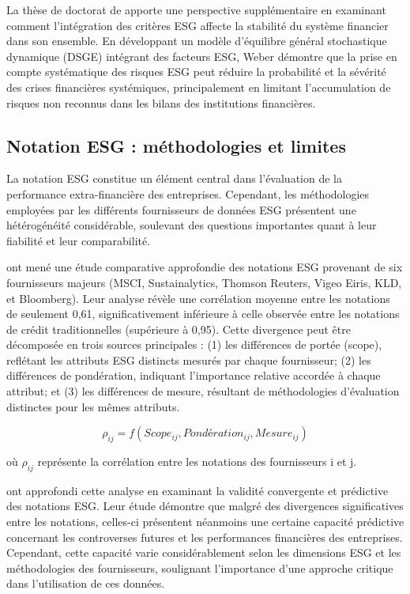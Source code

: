 La thèse de doctorat de \citet{weber2018} apporte une perspective supplémentaire en examinant comment l'intégration des critères ESG affecte la stabilité du système financier dans son ensemble. En développant un modèle d'équilibre général stochastique dynamique (DSGE) intégrant des facteurs ESG, Weber démontre que la prise en compte systématique des risques ESG peut réduire la probabilité et la sévérité des crises financières systémiques, principalement en limitant l'accumulation de risques non reconnus dans les bilans des institutions financières.

\subsection{Notation ESG : méthodologies et limites}

La notation ESG constitue un élément central dans l'évaluation de la performance extra-financière des entreprises. Cependant, les méthodologies employées par les différents fournisseurs de données ESG présentent une hétérogénéité considérable, soulevant des questions importantes quant à leur fiabilité et leur comparabilité.

\citet{berg2020} ont mené une étude comparative approfondie des notations ESG provenant de six fournisseurs majeurs (MSCI, Sustainalytics, Thomson Reuters, Vigeo Eiris, KLD, et Bloomberg). Leur analyse révèle une corrélation moyenne entre les notations de seulement 0,61, significativement inférieure à celle observée entre les notations de crédit traditionnelles (supérieure à 0,95). Cette divergence peut être décomposée en trois sources principales : (1) les différences de portée (scope), reflétant les attributs ESG distincts mesurés par chaque fournisseur; (2) les différences de pondération, indiquant l'importance relative accordée à chaque attribut; et (3) les différences de mesure, résultant de méthodologies d'évaluation distinctes pour les mêmes attributs.

\begin{equation}
\rho_{ij} = f(Scope_{ij}, Pondération_{ij}, Mesure_{ij})
\end{equation}

où $\rho_{ij}$ représente la corrélation entre les notations des fournisseurs i et j.

\citet{chatterji2016} ont approfondi cette analyse en examinant la validité convergente et prédictive des notations ESG. Leur étude démontre que malgré des divergences significatives entre les notations, celles-ci présentent néanmoins une certaine capacité prédictive concernant les controverses futures et les performances financières des entreprises. Cependant, cette capacité varie considérablement selon les dimensions ESG et les méthodologies des fournisseurs, soulignant l'importance d'une approche critique dans l'utilisation de ces données.

